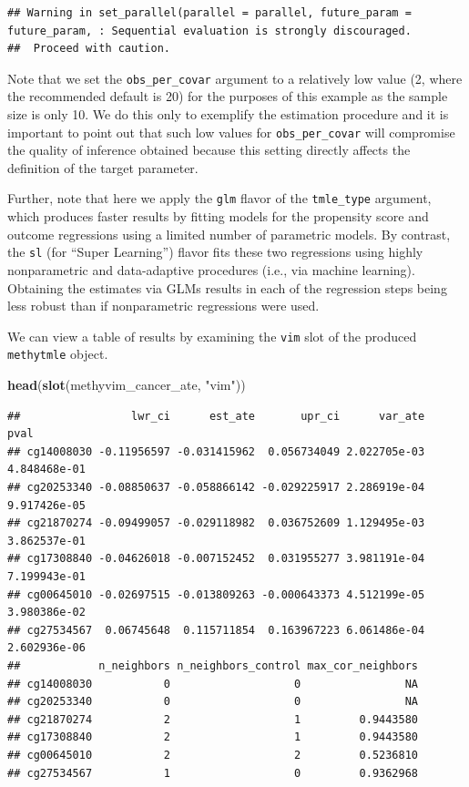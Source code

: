 \documentclass[9pt,a4paper,]{extarticle}
\newenvironment{Shaded}{\begin{snugshade}}{\end{snugshade}}
\newcommand{\KeywordTok}[1]{\textcolor[rgb]{0.13,0.29,0.53}{\textbf{#1}}}
\newcommand{\NormalTok}[1]{#1}
\newcommand{\StringTok}[1]{\textcolor[rgb]{0.31,0.60,0.02}{#1}}
\theoremstyle{definition}
\theoremstyle{definition}
\theoremstyle{definition}
\theoremstyle{remark}
\begin{document}
\begin{verbatim}
## Warning in set_parallel(parallel = parallel, future_param = future_param, : Sequential evaluation is strongly discouraged. 
##  Proceed with caution.
\end{verbatim}

Note that we set the \texttt{obs\_per\_covar} argument to a relatively low value (2,
where the recommended default is 20) for the purposes of this example as the
sample size is only 10. We do this only to exemplify the estimation procedure
and it is important to point out that such low values for \texttt{obs\_per\_covar} will
compromise the quality of inference obtained because this setting directly
affects the definition of the target parameter.

Further, note that here we apply the \texttt{glm} flavor of the \texttt{tmle\_type} argument,
which produces faster results by fitting models for the propensity score and
outcome regressions using a limited number of parametric models. By contrast,
the \texttt{sl} (for ``Super Learning'') flavor fits these two regressions using highly
nonparametric and data-adaptive procedures (i.e., via machine learning).
Obtaining the estimates via GLMs results in each of the regression steps
being less robust than if nonparametric regressions were used.

We can view a table of results by examining the \texttt{vim} slot of the produced
\texttt{methytmle} object.

\begin{Shaded}
\begin{Highlighting}[]
\KeywordTok{head}\NormalTok{(}\KeywordTok{slot}\NormalTok{(methyvim_cancer_ate, }\StringTok{"vim"}\NormalTok{))}
\end{Highlighting}
\end{Shaded}

\begin{verbatim}
##                 lwr_ci      est_ate       upr_ci      var_ate         pval
## cg14008030 -0.11956597 -0.031415962  0.056734049 2.022705e-03 4.848468e-01
## cg20253340 -0.08850637 -0.058866142 -0.029225917 2.286919e-04 9.917426e-05
## cg21870274 -0.09499057 -0.029118982  0.036752609 1.129495e-03 3.862537e-01
## cg17308840 -0.04626018 -0.007152452  0.031955277 3.981191e-04 7.199943e-01
## cg00645010 -0.02697515 -0.013809263 -0.000643373 4.512199e-05 3.980386e-02
## cg27534567  0.06745648  0.115711854  0.163967223 6.061486e-04 2.602936e-06
##            n_neighbors n_neighbors_control max_cor_neighbors
## cg14008030           0                   0                NA
## cg20253340           0                   0                NA
## cg21870274           2                   1         0.9443580
## cg17308840           2                   1         0.9443580
## cg00645010           2                   2         0.5236810
## cg27534567           1                   0         0.9362968
\end{verbatim}
\end{document}
